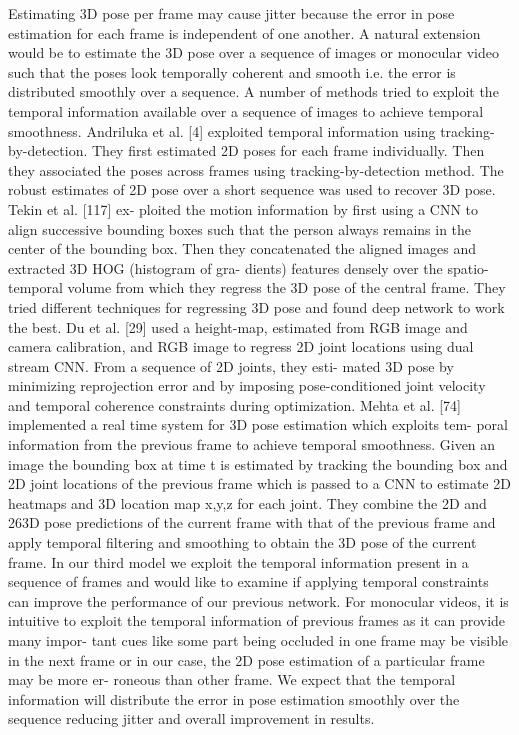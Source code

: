 Estimating 3D pose per frame may cause jitter because the error in pose estimation
for each frame is independent of one another. A natural extension would be to
estimate the 3D pose over a sequence of images or monocular video such that the
poses look temporally coherent and smooth i.e. the error is distributed smoothly
over a sequence. A number of methods tried to exploit the temporal information
available over a sequence of images to achieve temporal smoothness.
Andriluka et al. [4] exploited temporal information using tracking-by-detection.
They first estimated 2D poses for each frame individually. Then they associated the
poses across frames using tracking-by-detection method. The robust estimates of
2D pose over a short sequence was used to recover 3D pose. Tekin et al. [117] ex-
ploited the motion information by first using a CNN to align successive bounding
boxes such that the person always remains in the center of the bounding box. Then
they concatenated the aligned images and extracted 3D HOG (histogram of gra-
dients) features densely over the spatio-temporal volume from which they regress
the 3D pose of the central frame. They tried different techniques for regressing 3D
pose and found deep network to work the best. Du et al. [29] used a height-map,
estimated from RGB image and camera calibration, and RGB image to regress 2D
joint locations using dual stream CNN. From a sequence of 2D joints, they esti-
mated 3D pose by minimizing reprojection error and by imposing pose-conditioned
joint velocity and temporal coherence constraints during optimization. Mehta et al.
[74] implemented a real time system for 3D pose estimation which exploits tem-
poral information from the previous frame to achieve temporal smoothness. Given
an image the bounding box at time t is estimated by tracking the bounding box
and 2D joint locations of the previous frame which is passed to a CNN to estimate
2D heatmaps and 3D location map x,y,z for each joint. They combine the 2D and
263D pose predictions of the current frame with that of the previous frame and apply
temporal filtering and smoothing to obtain the 3D pose of the current frame.
In our third model we exploit the temporal information present in a sequence
of frames and would like to examine if applying temporal constraints can improve
the performance of our previous network. For monocular videos, it is intuitive to
exploit the temporal information of previous frames as it can provide many impor-
tant cues like some part being occluded in one frame may be visible in the next
frame or in our case, the 2D pose estimation of a particular frame may be more er-
roneous than other frame. We expect that the temporal information will distribute
the error in pose estimation smoothly over the sequence reducing jitter and overall
improvement in results.

